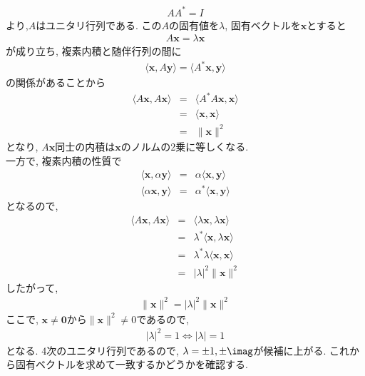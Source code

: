 \documentclass[dvipdfmx,titlepage, 11pt, a4paper]{jsarticle}%
\begin{document}
\begin{enumerate}[(1)]
\begin{eqnarray*}
        AA^{\ast}=I
    \end{eqnarray*}
    より,$A$はユニタリ行列である. この$A$の固有値を$\lambda$, 固有ベクトルを$\bm{x}$とすると
    \begin{eqnarray*}
        A\bm{x}=\lambda \bm{x}
    \end{eqnarray*}
    が成り立ち, 複素内積と随伴行列の間に
    \begin{eqnarray*}
        \langle \bm{x},A\bm{y}\rangle = \langle A^{\ast}\bm{x},\bm{y}\rangle
    \end{eqnarray*}
    の関係があることから
    \begin{eqnarray*}
        \langle A\bm{x},A\bm{x}\rangle &=& \langle A^{\ast}A\bm{x},\bm{x}\rangle\\
                                       &=&\langle \bm{x},\bm{x}\rangle\\
                                       &=&\|\bm{x}\|^{2}
    \end{eqnarray*}
    となり, $A\bm{x}$同士の内積は$\bm{x}$のノルムの2乗に等しくなる.\\
    一方で, 複素内積の性質で
    \begin{eqnarray*}
        \langle \bm{x},\alpha \bm{y}\rangle &=& \alpha \langle \bm{x},\bm{y}\rangle \\
        \langle \alpha \bm{x},\bm{y}\rangle &=& \alpha^{\ast}\langle \bm{x},\bm{y}\rangle
    \end{eqnarray*}
    となるので,
    \begin{eqnarray*}
        \langle A\bm{x},A\bm{x}\rangle &=& \langle \lambda \bm{x},\lambda \bm{x}\rangle \\
                                       &=&\lambda^{\ast}\langle \bm{x},\lambda \bm{x}\rangle\\
                                       &=& \lambda^{\ast}\lambda \langle \bm{x},\bm{x}\rangle\\
                                       &=&|\lambda|^{2}\|\bm{x}\|^{2}
    \end{eqnarray*}
    したがって,
    \begin{eqnarray*}
      \|\bm{x}\|^{2} = |\lambda|^{2}\|\bm{x}\|^{2}
    \end{eqnarray*}
    ここで, $\bm{x}\neq \bm{0}$から$\|\bm{x}\|^{2}\neq 0$であるので,
    \begin{eqnarray*}
      |\lambda|^{2} = 1\Longleftrightarrow |\lambda| = 1
    \end{eqnarray*}
    となる. 4次のユニタリ行列であるので, $\lambda =\pm 1,\pm \imag$が候補に上がる. これから固有ベクトルを求めて一致するかどうかを確認する.

\end{enumerate}
\end{document}
